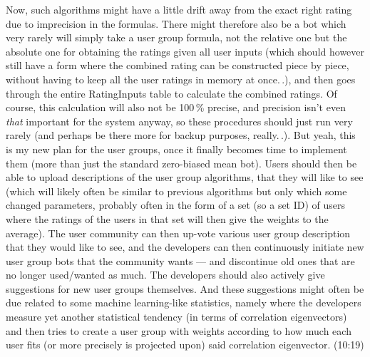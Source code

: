 \documentclass{report}
\begin{document}
Now, such algorithms might have a little drift away from the exact right rating due to imprecision in the formulas. There might therefore also be a bot which very rarely will simply take a user group formula, not the relative one but the absolute one for obtaining the ratings given all user inputs (which should however still have a form where the combined rating can be constructed piece by piece, without having to keep all the user ratings in memory at once.\,.), and then goes through the entire RatingInputs table to calculate the combined ratings. Of course, this calculation will also not be 100\,\% precise, and precision isn't even \emph{that} important for the system anyway, so these procedures should just run very rarely (and perhaps be there more for backup purposes, really.\,.). But yeah, this is my new plan for the user groups, once it finally becomes time to implement them (more than just the standard zero-biased mean bot). Users should then be able to upload descriptions of the user group algorithms, that they will like to see (which will likely often be similar to previous algorithms but only which some changed parameters, probably often in the form of a set (so a set ID) of users where the ratings of the users in that set will then give the weights to the average). The user community can then up-vote various user group description that they would like to see, and the developers can then continuously initiate new user group bots that the community wants --- and discontinue old ones that are no longer used/wanted as much. The developers should also actively give suggestions for new user groups themselves. And these suggestions might often be due related to some machine learning-like statistics, namely where the developers measure yet another statistical tendency (in terms of correlation eigenvectors) and then tries to create a user group with weights according to how much each user fits (or more precisely is projected upon) said correlation eigenvector. (10:19)
\end{document}
